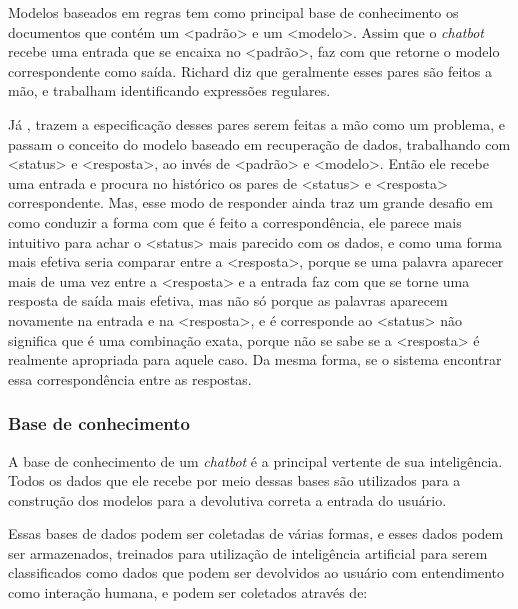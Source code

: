 \documentclass[
	12pt,				%
	oneside,
	a4paper,			%
	english,			%
	french,				%
	spanish,			%
	brazil				%
	]{abntex2}
\begin{document}
Modelos baseados em regras tem como principal base de conhecimento os documentos que contém um <padrão> e um <modelo>. Assim que o \emph{chatbot} recebe uma entrada que se encaixa no <padrão>, faz com que retorne o modelo correspondente como saída. Richard diz que geralmente esses pares são feitos a mão, e trabalham identificando expressões regulares.

Já \textcite{yan-etal-2016-docchat}, trazem a especificação desses pares serem feitas a mão como um problema, e passam o conceito do modelo baseado em recuperação de dados, trabalhando com <status> e <resposta>, ao invés de <padrão> e <modelo>. Então ele recebe uma entrada e procura no histórico os pares de <status> e <resposta> correspondente. Mas, esse modo de responder ainda traz um grande desafio em como conduzir a forma com que é feito a correspondência, ele parece mais intuitivo para achar o <status> mais parecido com os dados, e como uma forma mais efetiva seria comparar entre a <resposta>, porque se uma palavra aparecer mais de uma vez entre a <resposta> e a entrada faz com que se torne uma resposta de saída mais efetiva, mas não só porque as palavras aparecem novamente na entrada e na <resposta>, e é corresponde ao <status> não significa que é uma combinação exata, porque não se sabe se a <resposta> é realmente apropriada para aquele caso. Da mesma forma, se o sistema encontrar essa correspondência entre as respostas.

\subsubsection{Base de conhecimento}
A base de conhecimento de um \emph{chatbot} é a principal vertente de sua inteligência. Todos os dados que ele recebe por meio dessas bases são utilizados para a construção dos modelos para a devolutiva correta a entrada do usuário.

Essas bases de dados podem ser coletadas de várias formas, e esses dados podem ser armazenados, treinados para utilização de inteligência artificial para serem classificados como dados que podem ser devolvidos ao usuário com entendimento como interação humana, e podem ser coletados através de:
\end{document}
